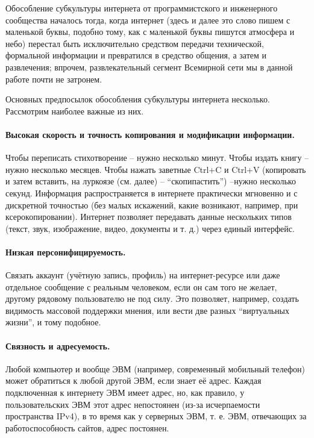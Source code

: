 Обособление субкультуры интернета от программистского и инженерного сообщества началось тогда, когда интернет (здесь и далее это слово пишем с маленькой буквы, подобно тому, как с маленькой буквы пишутся атмосфера и небо) перестал быть исключительно средством передачи технической, формальной информации и превратился в средство общения, а затем и развлечения; впрочем, развлекательный сегмент Всемирной сети мы в данной работе почти не затронем.

Основных предпосылок обособления субкультуры интернета несколько. Рассмотрим наиболее важные из них.

\paragraph{Высокая скорость и точность копирования и модификации информации.}

Чтобы переписать стихотворение -- нужно несколько минут. Чтобы издать книгу -- нужно несколько месяцев. Чтобы нажать заветные Ctrl+C и Ctrl+V (копировать и затем вставить, на луркоязе (см. далее) -- ``скопипастить'') --нужно несколько секунд. Информация распространяется в интернете практически мгновенно и с дискретной точностью (без малых искажений, какие возникают, например, при ксерокопировании). Интернет позволяет передавать данные нескольких типов (текст, звук, изображение, видео, документы и т. д.) через единый интерфейс.

\paragraph{Низкая персонифицируемость.}

Связать аккаунт (учётную запись, профиль) на интернет-ресурсе или даже отдельное сообщение с реальным человеком, если он сам того не желает, другому рядовому пользователю не под силу. Это позволяет, например, создать видимость массовой поддержки мнения, или вести две разных ``виртуальных жизни'', и тому подобное.

\paragraph{Связность и адресуемость.}

Любой компьютер и вообще ЭВМ (например, современный мобильный телефон) может обратиться к любой другой ЭВМ, если знает её адрес. Каждая подключенная к интернету ЭВМ имеет адрес, но, как правило, у пользовательских ЭВМ этот адрес непостоянен (из-за исчерпаемости пространства IPv4), в то время как у серверных ЭВМ, т. е. ЭВМ, отвечающих за работоспособность сайтов, адрес постоянен.

